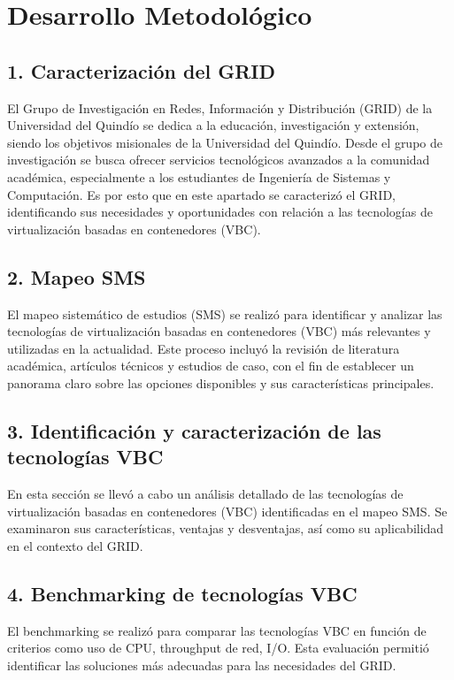 \chapter*{Desarrollo Metodológico}

\section*{1. Caracterización del GRID}
El Grupo de Investigación en Redes, Información y Distribución (GRID) de la Universidad del Quindío se dedica a la educación, investigación y extensión, siendo los objetivos misionales de la Universidad del Quindío. 
Desde el grupo de investigación se busca ofrecer servicios tecnológicos avanzados a la comunidad académica, especialmente a los estudiantes de Ingeniería de Sistemas y Computación.
Es por esto que en este apartado se caracterizó el GRID, identificando sus necesidades y oportunidades con relación a las tecnologías de virtualización basadas en contenedores (VBC).

\section*{2. Mapeo SMS}
El mapeo sistemático de estudios (SMS) se realizó para identificar y analizar las tecnologías de virtualización basadas en contenedores (VBC) más relevantes 
y utilizadas en la actualidad. Este proceso incluyó la revisión de literatura académica, artículos técnicos y estudios de caso, con el fin de establecer un 
panorama claro sobre las opciones disponibles y sus características principales.

\section*{3. Identificación y caracterización de las tecnologías VBC}
En esta sección se llevó a cabo un análisis detallado de las tecnologías de virtualización basadas en contenedores (VBC) identificadas en el mapeo SMS. Se examinaron sus características, ventajas y desventajas, así como su aplicabilidad en el contexto del GRID.

\section*{4. Benchmarking de tecnologías VBC}
El benchmarking se realizó para comparar las tecnologías VBC en función de criterios como uso de CPU, throughput de red, I/O. Esta evaluación permitió identificar las soluciones más adecuadas para las necesidades del GRID.

